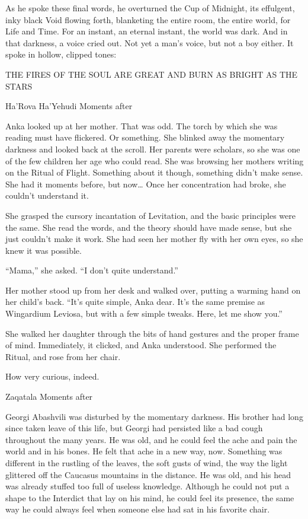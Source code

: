 As he spoke these final words, he overturned the Cup of Midnight, its effulgent, inky black Void flowing forth, blanketing the entire room, the entire world, for Life and Time. For an instant, an eternal instant, the world was dark. And in that darkness, a voice cried out. Not yet a man’s voice, but not a boy either. It spoke in hollow, clipped tones:

THE FIRES OF THE SOUL ARE GREAT
AND BURN AS BRIGHT AS THE STARS

Ha’Rova Ha’Yehudi
Moments after

Anka looked up at her mother. That was odd. The torch by which she was reading must have flickered. Or something. She blinked away the momentary darkness and looked back at the scroll. Her parents were scholars, so she was one of the few children her age who could read. She was browsing her mothers writing on the Ritual of Flight. Something about it though, something didn’t make sense. She had it moments before, but now… Once her concentration had broke, she couldn’t understand it.

She grasped the cursory incantation of Levitation, and the basic principles were the same. She read the words, and the theory should have made sense, but she just couldn’t make it work. She had seen her mother fly with her own eyes, so she knew it was possible.

“Mama,” she asked. “I don’t quite understand.”

Her mother stood up from her desk and walked over, putting a warming hand on her child’s back. “It’s quite simple, Anka dear. It’s the same premise as Wingardium Leviosa, but with a few simple tweaks. Here, let me show you.”

She walked her daughter through the bits of hand gestures and the proper frame of mind. Immediately, it clicked, and Anka understood. She performed the Ritual, and rose from her chair.

How very curious, indeed.

Zaqatala
Moments after

Georgi Abashvili was disturbed by the momentary darkness. His brother had long since taken leave of this life, but Georgi had persisted like a bad cough throughout the many years. He was old, and he could feel the ache and pain the world and in his bones. He felt that ache in a new way, now. Something was different in the rustling of the leaves, the soft gusts of wind, the way the light glittered off the Caucasus mountains in the distance. He was old, and his head was already stuffed too full of useless knowledge. Although he could not put a shape to the Interdict that lay on his mind, he could feel its presence, the same way he could always feel when someone else had sat in his favorite chair.

